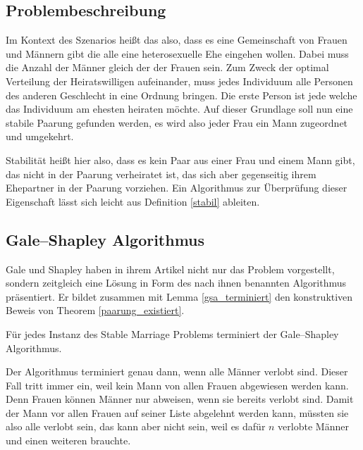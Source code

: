 \subsection{Problembeschreibung}

Im Kontext des Szenarios heißt das also, dass es eine Gemeinschaft von Frauen und Männern gibt die alle eine heterosexuelle Ehe eingehen wollen. Dabei muss die Anzahl der Männer gleich der der Frauen sein. Zum Zweck der optimal Verteilung der Heiratswilligen aufeinander, muss jedes Individuum alle Personen des anderen Geschlecht in eine Ordnung bringen. Die erste Person ist jede welche das Individuum am ehesten heiraten möchte. Auf dieser Grundlage soll nun eine stabile Paarung gefunden werden, es wird also jeder Frau ein Mann zugeordnet und umgekehrt.

Stabilität heißt hier also, dass es kein Paar aus einer Frau und einem Mann gibt, das nicht in der Paarung verheiratet ist, das sich aber gegenseitig ihrem Ehepartner in der Paarung vorziehen. Ein Algorithmus zur Überprüfung dieser Eigenschaft lässt sich leicht aus Definition \ref{stabil} ableiten.



\subsection{Gale–Shapley Algorithmus}

Gale und Shapley haben in ihrem Artikel \cite{Gale:1962} nicht nur das Problem vorgestellt, sondern zeitgleich eine Lösung in Form des nach ihnen benannten Algorithmus präsentiert. Er bildet zusammen mit Lemma \ref{gsa_terminiert} den konstruktiven Beweis von Theorem \ref{paarung_existiert}.



\begin{Lemma}
\label{gsa_terminiert}
  Für jedes Instanz des Stable Marriage Problems terminiert der Gale–Shapley Algorithmus.
\end{Lemma}

\begin{Beweis}
\label{gsa_terminiert_bew}
  Der Algorithmus terminiert genau dann, wenn alle Männer verlobt sind. Dieser Fall tritt immer ein, weil kein Mann von allen Frauen abgewiesen werden kann. Denn Frauen können Männer nur abweisen, wenn sie bereits verlobt sind. Damit der Mann vor allen Frauen auf seiner Liste abgelehnt werden kann, müssten sie also alle verlobt sein, das kann aber nicht sein, weil es dafür $n$ verlobte Männer und einen weiteren brauchte.
\end{Beweis}

